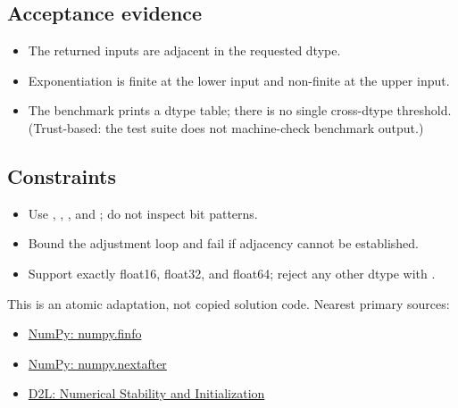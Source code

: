         \subsection{Acceptance evidence}

        \begin{evidencebox}
        \begin{itemize}
          \item The returned inputs are adjacent in the requested dtype.
  \item Exponentiation is finite at the lower input and non-finite at the upper input.
  \item The benchmark prints a dtype table; there is no single cross-dtype threshold. (Trust-based: the test suite does not machine-check benchmark output.)
        \end{itemize}
        \end{evidencebox}

        \subsection{Constraints}

        \begin{itemize}
          \item Use , , , and ; do not inspect bit patterns.
  \item Bound the adjustment loop and fail if adjacency cannot be established.
  \item Support exactly float16, float32, and float64; reject any other dtype with .
        \end{itemize}

        \begin{sourcebox}
        This is an atomic adaptation, not copied solution code. Nearest primary sources:
        \begin{itemize}
          \item \href{https://numpy.org/doc/stable/reference/generated/numpy.finfo.html}{NumPy: numpy.finfo}
  \item \href{https://numpy.org/doc/stable/reference/generated/numpy.nextafter.html}{NumPy: numpy.nextafter}
  \item \href{https://d2l.ai/chapter_multilayer-perceptrons/numerical-stability-and-init.html}{D2L: Numerical Stability and Initialization}
        \end{itemize}
        \end{sourcebox}
